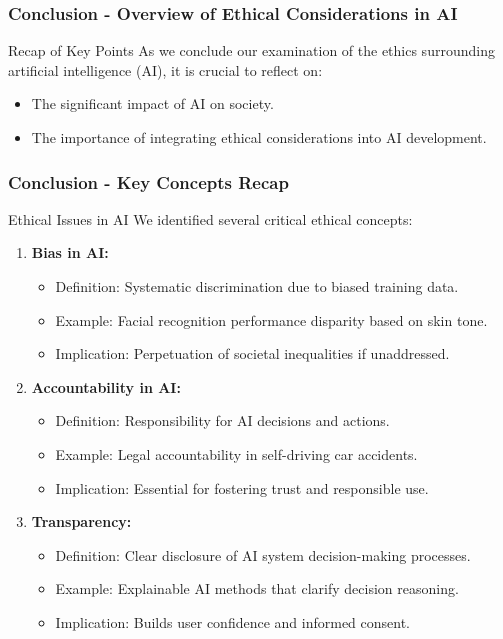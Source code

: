 \documentclass[aspectratio=169]{beamer}
\begin{document}
\begin{frame}[fragile]
    \frametitle{Conclusion - Overview of Ethical Considerations in AI}
    \begin{block}{Recap of Key Points}
        As we conclude our examination of the ethics surrounding artificial intelligence (AI), it is crucial to reflect on:
        \begin{itemize}
            \item The significant impact of AI on society.
            \item The importance of integrating ethical considerations into AI development.
        \end{itemize}
    \end{block}
\end{frame}

\begin{frame}[fragile]
    \frametitle{Conclusion - Key Concepts Recap}
    \begin{block}{Ethical Issues in AI}
        We identified several critical ethical concepts:
        \begin{enumerate}
            \item \textbf{Bias in AI:}
                \begin{itemize}
                    \item Definition: Systematic discrimination due to biased training data.
                    \item Example: Facial recognition performance disparity based on skin tone.
                    \item Implication: Perpetuation of societal inequalities if unaddressed.
                \end{itemize}
            
            \item \textbf{Accountability in AI:}
                \begin{itemize}
                    \item Definition: Responsibility for AI decisions and actions.
                    \item Example: Legal accountability in self-driving car accidents.
                    \item Implication: Essential for fostering trust and responsible use.
                \end{itemize}
            
            \item \textbf{Transparency:}
                \begin{itemize}
                    \item Definition: Clear disclosure of AI system decision-making processes.
                    \item Example: Explainable AI methods that clarify decision reasoning.
                    \item Implication: Builds user confidence and informed consent.
                \end{itemize}
        \end{enumerate}
    \end{block}
\end{frame}
\end{document}
